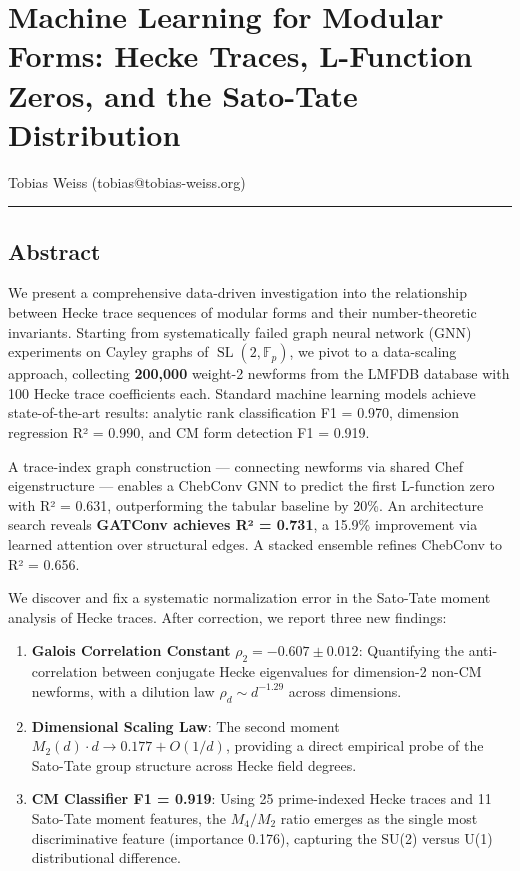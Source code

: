 \documentclass[
]{article}
\author{}
\date{}
\begin{document}
\hypertarget{machine-learning-for-modular-forms-hecke-traces-l-function-zeros-and-the-sato-tate-distribution}{%
\section{Machine Learning for Modular Forms: Hecke Traces, L-Function
Zeros, and the Sato-Tate
Distribution}\label{machine-learning-for-modular-forms-hecke-traces-l-function-zeros-and-the-sato-tate-distribution}}

Tobias Weiss (tobias@tobias-weiss.org)

\begin{center}\rule{0.5\linewidth}{0.5pt}\end{center}

\hypertarget{abstract}{%
\subsection{Abstract}\label{abstract}}

We present a comprehensive data-driven investigation into the
relationship between Hecke trace sequences of modular forms and their
number-theoretic invariants. Starting from systematically failed graph
neural network (GNN) experiments on Cayley graphs of
\(\operatorname{SL}(2,\mathbb{F}_p)\), we pivot to a data-scaling
approach, collecting \textbf{200,000} weight-2 newforms from the LMFDB
database with 100 Hecke trace coefficients each. Standard machine
learning models achieve state-of-the-art results: analytic rank
classification F1 = 0.970, dimension regression R² = 0.990, and CM form
detection F1 = 0.919.

A trace-index graph construction --- connecting newforms via shared Chef
eigenstructure --- enables a ChebConv GNN to predict the first
L-function zero with R² = 0.631, outperforming the tabular baseline by
20\%. An architecture search reveals \textbf{GATConv achieves R² =
0.731}, a 15.9\% improvement via learned attention over structural
edges. A stacked ensemble refines ChebConv to R² = 0.656.

We discover and fix a systematic normalization error in the Sato-Tate
moment analysis of Hecke traces. After correction, we report three new
findings:

\begin{enumerate}
\def\labelenumi{\arabic{enumi}.}
\item
  \textbf{Galois Correlation Constant} \(\rho_2 = -0.607 \pm 0.012\):
  Quantifying the anti-correlation between conjugate Hecke eigenvalues
  for dimension-2 non-CM newforms, with a dilution law
  \(\rho_d \sim d^{-1.29}\) across dimensions.
\item
  \textbf{Dimensional Scaling Law}: The second moment
  \(M_2(d) \cdot d \to 0.177 + O(1/d)\), providing a direct empirical
  probe of the Sato-Tate group structure across Hecke field degrees.
\item
  \textbf{CM Classifier F1 = 0.919}: Using 25 prime-indexed Hecke traces
  and 11 Sato-Tate moment features, the \(M_4/M_2\) ratio emerges as the
  single most discriminative feature (importance 0.176), capturing the
  SU(2) versus U(1) distributional difference.
\end{enumerate}
\end{document}
